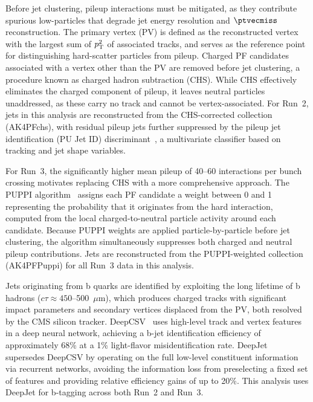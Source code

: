 Before jet clustering, pileup interactions must be mitigated, as they contribute spurious low-\pT particles that degrade jet energy resolution and $\ptvecmiss$ reconstruction. The primary vertex (PV) is defined as the reconstructed vertex with the largest sum of $p_{\mathrm{T}}^2$ of associated tracks, and serves as the reference point for distinguishing hard-scatter particles from pileup. Charged PF candidates associated with a vertex other than the PV are removed before jet clustering, a procedure known as charged hadron subtraction (CHS). While CHS effectively eliminates the charged component of pileup, it leaves neutral particles unaddressed, as these carry no track and cannot be vertex-associated. For Run~2, jets in this analysis are reconstructed from the CHS-corrected collection (AK4PFchs), with residual pileup jets further suppressed by the pileup jet identification (PU Jet ID) discriminant~\cite{CMS:2020ebo}, a multivariate classifier based on tracking and jet shape variables.

For Run~3, the significantly higher mean pileup of 40--60 interactions per bunch crossing motivates replacing CHS with a more comprehensive approach. The PUPPI algorithm~\cite{Bertolini:2014bba} assigns each PF candidate a weight between 0 and 1 representing the probability that it originates from the hard interaction, computed from the local charged-to-neutral particle activity around each candidate. Because PUPPI weights are applied particle-by-particle before jet clustering, the algorithm simultaneously suppresses both charged and neutral pileup contributions. Jets are reconstructed from the PUPPI-weighted collection (AK4PFPuppi) for all Run~3 data in this analysis.

Jets originating from b quarks are identified by exploiting the long lifetime of b hadrons ($c\tau \approx 450$--500~$\mu$m), which produces charged tracks with significant impact parameters and secondary vertices displaced from the PV, both resolved by the CMS silicon tracker. DeepCSV~\cite{CMS:2017wtu} uses high-level track and vertex features in a deep neural network, achieving a b-jet identification efficiency of approximately 68\% at a 1\% light-flavor misidentification rate. DeepJet~\cite{Bols:2020bkb} supersedes DeepCSV by operating on the full low-level constituent information via recurrent networks, avoiding the information loss from preselecting a fixed set of features and providing relative efficiency gains of up to 20\%. This analysis uses DeepJet for b-tagging across both Run~2 and Run~3.

